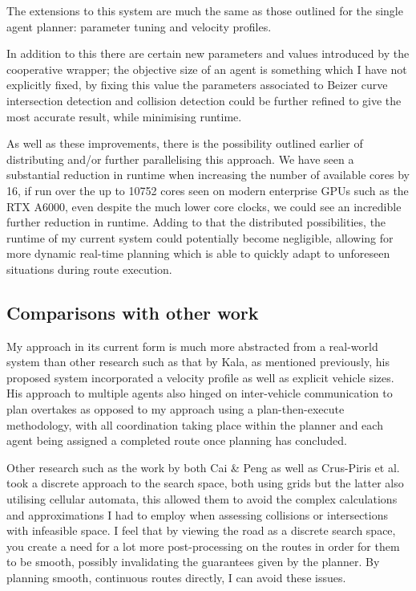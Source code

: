 The extensions to this system are much the same as those outlined for the single agent planner: parameter tuning and velocity profiles.

In addition to this there are certain new parameters and values introduced by the cooperative wrapper; the objective size of an agent is something which I have not explicitly fixed, by fixing this value the parameters associated to Beizer curve intersection detection and collision detection could be further refined to give the most accurate result, while minimising runtime.

As well as these improvements, there is the possibility outlined earlier of distributing and/or further parallelising this approach. We have seen a substantial reduction in runtime when increasing the number of available cores by 16, if run over the up to 10752 cores seen on modern enterprise GPUs such as the RTX A6000, even despite the much lower core clocks, we could see an incredible further reduction in runtime. Adding to that the distributed possibilities, the runtime of my current system could potentially become negligible, allowing for more dynamic real-time planning which is able to quickly adapt to unforeseen situations during route execution.

\subsection{Comparisons with other work}

My approach in its current form is much more abstracted from a real-world system than other research such as that by Kala, as mentioned previously, his proposed system incorporated a velocity profile as well as explicit vehicle sizes. His approach to multiple agents also hinged on inter-vehicle communication to plan overtakes as opposed to my approach using a plan-then-execute methodology, with all coordination taking place within the planner and each agent being assigned a completed route once planning has concluded.


Other research such as the work by both Cai \& Peng as well as Crus-Piris et al. took a discrete approach to the search space, both using grids but the latter also utilising cellular automata, this allowed them to avoid the complex calculations and approximations I had to employ when assessing collisions or intersections with infeasible space. I feel that by viewing the road as a discrete search space, you create a need for a lot more post-processing on the routes in order for them to be smooth, possibly invalidating the guarantees given by the planner. By planning smooth, continuous routes directly, I can avoid these issues.

